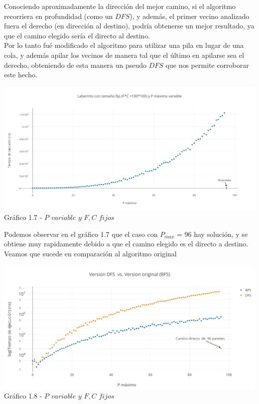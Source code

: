 Conociendo aproximadamente la dirección del mejor camino, si el algoritmo recorriera en profundidad (como un $DFS$), y además, el primer vecino analizado fuera el derecho (en dirección al destino), podría obtenerse un mejor resultado, ya que el camino elegido sería el directo al destino.\\ 
Por lo tanto fué modificado el algoritmo para utilizar una pila en lugar de una cola, y además apilar los vecinos de manera tal que el último en apilarse sea el derecho, obteniendo de esta manera un pseudo $DFS$ que nos permite corroborar este hecho.\\

  \begin{center}
\includegraphics[scale=0.65]{./EJ1/pVariableDfs.png}
{Gr\'afico 1.7 - $P$ $variable$ $y$ $F,C$ $fijos$}
  \end{center}
  \vspace*{0.3cm}

Podemos observar en el gráfico 1.7 que el caso con $P_{max}$ = 96 hay solución, y se obtiene muy rapidamente debido a que el camino elegido es el directo a destino. Veamos que sucede en comparación al algoritmo original

  \begin{center}
\includegraphics[scale=0.6]{./EJ1/bfsVsDfs.png}
{Gr\'afico 1.8 - $P$ $variable$ $y$ $F,C$ $fijos$}
  \end{center}
  \vspace*{0.3cm}
  
